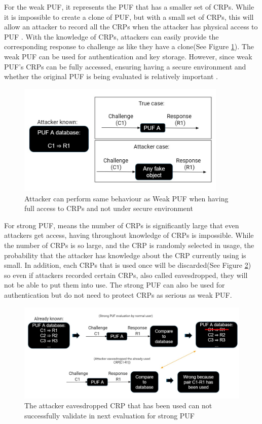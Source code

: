 For the weak PUF, it represents the PUF that has a smaller set of CRPs. While it is impossible to 
create a clone of PUF, but with a small set of CRPs, this will allow an attacker to record all the CRPs when the attacker has physical access to PUF \cite{Reference1}. With the knowledge of CRPs, attackers can easily provide the corresponding
response to challenge as like they have a clone(See Figure \ref{fig:figure2}). The weak PUF can be used for authentication and key storage. However, since weak PUF's CRPs can be fully accessed, ensuring having a secure environment and whether the original PUF is being evaluated is relatively important \cite{Reference1}.
\begin{figure}[htp]
    \centering
    \includegraphics[width=10cm]{figures/figure2.jpg}
    \caption{Attacker can perform same behaviour as Weak PUF when having full access to CRPs and not under secure environment}
    \label{fig:figure2}
    \end{figure}

For strong PUF, means the number of CRPs is significantly large that even attackers get access, having throughout knowledge of CRPs is impossible. While the number of CRPs is so large,
and the CRP is randomly selected in usage, the probability that the attacker has knowledge about the CRP currently using is small. In addition, each CRPs that is used once will 
be discarded(See Figure \ref{fig:figure3}) so even if attackers recorded certain CRPs, also called eavesdropped, they will not be able to put them into use. The strong PUF can also be used for authentication but do not need to protect CRPs
as serious as weak PUF.

\begin{figure}[htp]
    \centering
    \includegraphics[width=15cm]{figures/figure3.jpg}
    \caption{The attacker eavesdropped CRP that has been used can not successfully validate in next evaluation for strong PUF}
    \label{fig:figure3}
    \end{figure}

